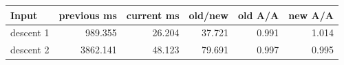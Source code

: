 \begin{center}
\small
\begin{tabular}{lrrrrr}
\toprule
Input & previous ms & current ms & old/new & old A/A & new A/A\\
\midrule
descent 1 & 989.355 & 26.204 & 37.721 & 0.991 & 1.014\\
descent 2 & 3862.141 & 48.123 & 79.691 & 0.997 & 0.995\\
\bottomrule
\end{tabular}
\end{center}
